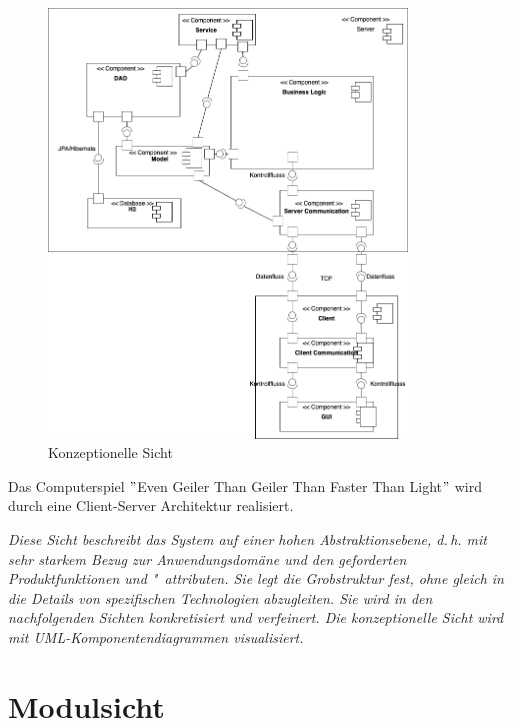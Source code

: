 \documentclass[fontsize=12pt,paper=a4,twoside]{scrartcl}
\begin{document}
\begin{figure}[!ht]
	\centering
  \includegraphics[width=0.85\textwidth]{Konzeptionelle_Sicht.png}
	\caption{Konzeptionelle Sicht}
	\label{fig1}
\end{figure}

Das Computerspiel $ " $Even Geiler Than Geiler Than Faster Than Light$ "$ wird durch eine Client-Server Architektur realisiert. 

{\itshape Diese Sicht beschreibt das System auf einer hohen Abstraktionsebene,
d.\,h. mit sehr starkem Bezug zur Anwendungsdomäne und den geforderten
Produktfunktionen und "~attributen. Sie legt die Grobstruktur fest, ohne gleich 
in die Details von spezifischen Technologien abzugleiten. Sie wird in den 
nachfolgenden Sichten konkretisiert und verfeinert. Die konzeptionelle Sicht 
wird mit {UML}-Komponentendiagrammen visualisiert.}


\section{Modulsicht} \label{sec:modulsicht}
\end{document}
